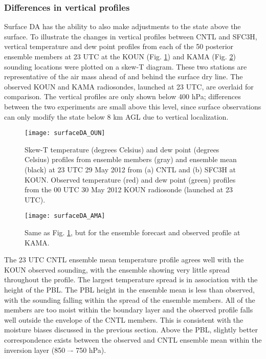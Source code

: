 \subsubsection{Differences in vertical profiles}
Surface DA has the ability to also make adjustments to the state above the surface. To illustrate the changes in vertical profiles between CNTL and SFC3H, vertical temperature and dew point profiles from each of the 50 posterior ensemble members at 23 UTC at the KOUN (Fig. \ref{sfcda_oun}) and KAMA (Fig. \ref{sfcda_ama}) sounding locations were plotted on a skew-T diagram. These two stations are representative of the air mass ahead of and behind the surface dry line. The observed KOUN and KAMA radiosondes, launched at 23 UTC, are overlaid for comparison. The vertical profiles are only shown below 400 hPa; differences between the two experiments are small above this level, since surface observations can only modify the state below 8 km AGL due to vertical localization.
\begin{figure}
\centering
\texttt{[image: surfaceDA\_OUN]}
\caption{Skew-T temperature (degrees Celsius) and dew point (degrees Celsius) profiles from ensemble members (gray) and ensemble mean (black) at 23 UTC 29 May 2012 from (a) CNTL and (b) SFC3H at KOUN. Observed temperature (red) and dew point (green) profiles from the 00 UTC 30 May 2012 KOUN radiosonde (launched at 23 UTC).}
\label{sfcda_oun}
\end{figure}
\begin{figure}
\centering
\texttt{[image: surfaceDA\_AMA]}
\caption{Same as Fig. \ref{sfcda_oun}, but for the ensemble forecast and observed profile at KAMA.}
\label{sfcda_ama}
\end{figure}

The 23 UTC CNTL ensemble mean temperature profile agrees well with the KOUN observed sounding, with the ensemble showing very little spread throughout the profile. The largest temperature spread is in association with the height of the PBL. The PBL height in the ensemble mean is less than observed, with the sounding falling within the spread of the ensemble members. All of the members are too moist within the boundary layer and the observed profile falls well outside the envelope of the CNTL members. This is consistent with the moisture biases discussed in the previous section. Above the PBL, slightly better correspondence exists between the observed and CNTL ensemble mean within the inversion layer (850 –- 750 hPa).

